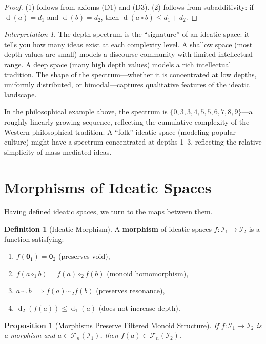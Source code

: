 \documentclass[11pt,openany]{book}
\theoremstyle{definition}
\newtheorem{definition}[axiom]{Definition}
\theoremstyle{plain}
\newtheorem{proposition}[axiom]{Proposition}
\theoremstyle{remark}
\newtheorem{interpretation}[axiom]{Interpretation}
\newcommand{\IS}{\mathcal{I}}               %
\newcommand{\compose}{\circ}                 %
\newcommand{\void}{\mathbf{0}}              %
\newcommand{\res}{\sim}                      %
\newcommand{\depth}{\operatorname{d}}       %
\newcommand{\Filt}[1]{\mathcal{F}_{#1}}     %
\begin{document}
\begin{proof}
(1) follows from axioms (D1) and (D3). (2) follows from subadditivity: if $\depth(a) = d_1$ and $\depth(b) = d_2$, then $\depth(a \compose b) \leq d_1 + d_2$.
\end{proof}

\begin{interpretation}
The depth spectrum is the ``signature'' of an ideatic space: it tells you how many ideas exist at each complexity level. A shallow space (most depth values are small) models a discourse community with limited intellectual range. A deep space (many high depth values) models a rich intellectual tradition. The shape of the spectrum---whether it is concentrated at low depths, uniformly distributed, or bimodal---captures qualitative features of the ideatic landscape.

In the philosophical example above, the spectrum is $\{0, 3, 3, 4, 5, 5, 6, 7, 8, 9\}$---a roughly linearly growing sequence, reflecting the cumulative complexity of the Western philosophical tradition. A ``folk'' ideatic space (modeling popular culture) might have a spectrum concentrated at depths 1--3, reflecting the relative simplicity of mass-mediated ideas.
\end{interpretation}

\section{Morphisms of Ideatic Spaces}

Having defined ideatic spaces, we turn to the maps between them.

\begin{definition}[Ideatic Morphism]
A \textbf{morphism} of ideatic spaces $f : \IS_1 \to \IS_2$ is a function satisfying:
\begin{enumerate}
\item $f(\void_1) = \void_2$ (preserves void),
\item $f(a \compose_1 b) = f(a) \compose_2 f(b)$ (monoid homomorphism),
\item $a \res_1 b \implies f(a) \res_2 f(b)$ (preserves resonance),
\item $\depth_2(f(a)) \leq \depth_1(a)$ (does not increase depth).
\end{enumerate}
\end{definition}

\begin{proposition}[Morphisms Preserve Filtered Monoid Structure]
If $f : \IS_1 \to \IS_2$ is a morphism and $a \in \Filt{n}(\IS_1)$, then $f(a) \in \Filt{n}(\IS_2)$.
\end{proposition}
\end{document}
